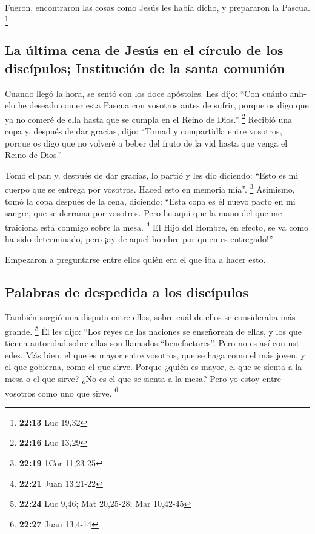 \begin{paracol}{2}
\begin{otherlanguage}{english}
 Fueron, encontraron las cosas como Jesús les había
dicho, y prepararon la Pascua. \footnote{\textbf{22:13} Luc 19,32}

\hypertarget{la-uxfaltima-cena-de-jesuxfas-en-el-cuxedrculo-de-los-discuxedpulos-instituciuxf3n-de-la-santa-comuniuxf3n}{%
\subsection{La última cena de Jesús en el círculo de los discípulos;
Institución de la santa
comunión}\label{la-uxfaltima-cena-de-jesuxfas-en-el-cuxedrculo-de-los-discuxedpulos-instituciuxf3n-de-la-santa-comuniuxf3n}}

 Cuando llegó la hora, se sentó con los doce apóstoles.
 Les dijo: ``Con cuánto anhelo he deseado comer esta
Pascua con vosotros antes de sufrir,  porque os digo que
ya no comeré de ella hasta que se cumpla en el Reino de Dios.''
\footnote{\textbf{22:16} Luc 13,29}  Recibió una copa y,
después de dar gracias, dijo: ``Tomad y compartidla entre vosotros,
 porque os digo que no volveré a beber del fruto de la
vid hasta que venga el Reino de Dios.''

 Tomó el pan y, después de dar gracias, lo partió y les
dio diciendo: ``Esto es mi cuerpo que se entrega por vosotros. Haced
esto en memoria mía''. \footnote{\textbf{22:19} 1Cor 11,23-25}
 Asimismo, tomó la copa después de la cena, diciendo:
``Esta copa es él nuevo pacto en mi sangre, que se derrama por vosotros.
 Pero he aquí que la mano del que me traiciona está
conmigo sobre la mesa. \footnote{\textbf{22:21} Juan 13,21-22}
 El Hijo del Hombre, en efecto, se va como ha sido
determinado, pero ¡ay de aquel hombre por quien es entregado!''

 Empezaron a preguntarse entre ellos quién era el que iba
a hacer esto.

\hypertarget{palabras-de-despedida-a-los-discuxedpulos}{%
\subsection{Palabras de despedida a los
discípulos}\label{palabras-de-despedida-a-los-discuxedpulos}}

 También surgió una disputa entre ellos, sobre cuál de
ellos se consideraba más grande. \footnote{\textbf{22:24} Luc 9,46; Mat
  20,25-28; Mar 10,42-45}  Él les dijo: ``Los reyes de
las naciones se enseñorean de ellas, y los que tienen autoridad sobre
ellas son llamados ``benefactores''.  Pero no es así con
ustedes. Más bien, el que es mayor entre vosotros, que se haga como el
más joven, y el que gobierna, como el que sirve.  Porque
¿quién es mayor, el que se sienta a la mesa o el que sirve? ¿No es el
que se sienta a la mesa? Pero yo estoy entre vosotros como uno que
sirve. \footnote{\textbf{22:27} Juan 13,4-14}


\end{otherlanguage}
\end{paracol}

